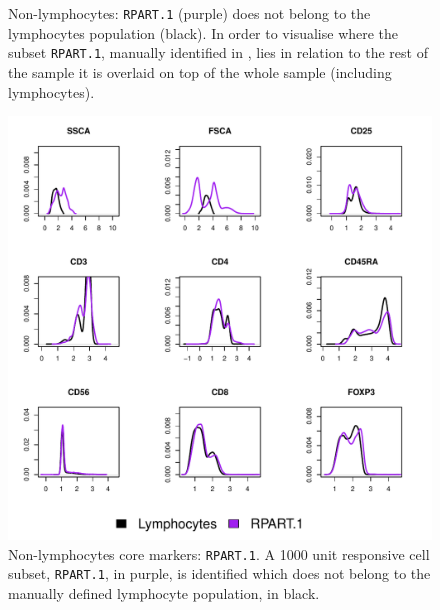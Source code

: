 \begin{figure}[!h]
\begin{minipage}{.6\textwidth}
\end{minipage}
\begin{minipage}{.3\textwidth}
{ Non-lymphocytes:  \texttt{RPART.1} (purple) does not belong to the lymphocytes population (black).  }
{
In order to visualise where the subset \texttt{RPART.1}, manually identified in , lies in relation to the rest of the sample it is overlaid on top of the whole sample (including lymphocytes).
}
\end{minipage}
\end{figure}

\begin{figure}
  \centering
\begin{minipage}{.9\textwidth}
\includegraphics[width=\linewidth]{figures/rpart-nonlymphocytes-clusters}
{ Non-lymphocytes core markers: \texttt{RPART.1}. }
{
    A 1000 unit responsive cell subset, \texttt{RPART.1}, in purple, is identified which does not belong to the manually defined lymphocyte population, in black. 
}
\end{minipage}
\end{figure}
